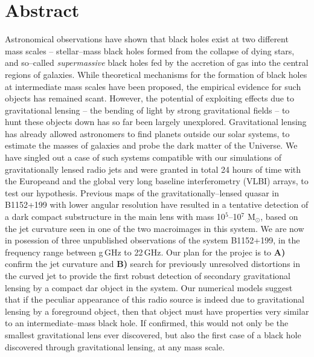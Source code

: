 \documentclass[a4paper, 11pt]{article}
\begin{document}
\section{Abstract}
Astronomical observations have shown that black holes exist at two different mass scales -- stellar--mass black holes formed from the collapse of dying stars, and so--called {\it supermassive} black holes fed by the accretion of gas into the central regions of galaxies. While theoretical mechanisms for the formation of black holes at intermediate mass scales have been proposed, the empirical evidence for such objects has remained scant. However, the potential of exploiting effects due to gravitational lensing -- the bending of light by strong gravitational fields -- to hunt these objects down has so far been largely unexplored.
Gravitational lensing has already allowed astronomers to find planets outside our solar systems, to estimate the masses of galaxies and probe the dark matter of the Universe. We have singled out a case of such systems compatible with our simulations of gravitationally lensed radio jets and were granted in total 24 hours of time with the Europeand and the global very long baseline interferometry (VLBI) arrays, to test our hypothesis. Previous maps of the gravitationally--lensed quasar in B1152+199 with lower angular resolution have resulted in a tentative detection of a dark compact substructure in the main lens with mass 10$^5$--10$^7$ M$_\odot$, based on the jet curvature seen in one of the two macroimages in this system. We are now in posession of three unpublished observations of the system B1152+199, in the frequency range between g\,GHz to 22\,GHz. Our plan for the projec is to {\bf A)} confirm the jet curvature and {\bf B)} search for previously unresolved distortions in the curved jet to provide the first robust detection of secondary gravitational lensing by a compact dar object in the system. Our numerical models suggest that if the peculiar appearance of this radio source is indeed due to gravitational lensing by a foreground object, then that object must have properties very similar to an intermediate--mass black hole. If confirmed, this would not only be the smallest gravitational lens ever discovered, but also the first case of a black hole discovered through gravitational lensing, at any mass scale.
\end{document}

